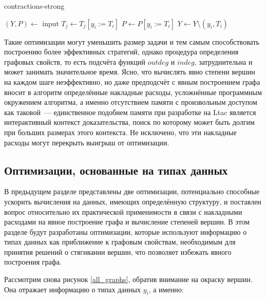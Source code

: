 \documentclass[../thesis.tex]{subfiles}
\begin{document}
\begin{megaalgorithm}
    \caption{contractions-strong}
  \begin{algorithmic}
    \State $(Y, P)\gets$ input
        \If{\textcolor{red}{$outdeg(y_i) = 1$}}
                \State $T_j \gets T_j [y_i := T_i]$
            \EndFor
            \State $P \gets P [y_i := T_i]$
            \State $Y\gets Y \setminus (y_i, T_i)$
        \EndIf
    \EndFor
    \State {}
  \end{algorithmic}
\end{megaalgorithm}

Такие оптимизации могут уменьшить размер задачи и тем самым способствовать построению более эффективных стратегий, однако процедура определения графовых свойств, то есть подсчёта функций $outdeg$ и $indeg$, затруднительна и может занимать значительное время. Ясно, что вычислять явно степени вершин на каждом шаге неэффективно, но даже предподсчёт с явным построением графа вносит в алгоритм определённые накладные расходы, усложнённые программным окружением алгоритма, а именно отсутствием памяти с произвольным доступом как таковой~--- единственное подобием памяти при разработке на Ltac является интерактивный контекст доказательства, поиск по которому может быть долгим при больших размерах этого контекста. Не исключено, что эти накладные расходы могут перекрыть выигрыш от оптимизации.

\subsection{Оптимизации, основанные на типах данных}\label{typebased}

В предыдущем разделе представлены две оптимизации, потенциально способные ускорить вычисления на данных, имеющих определённую структуру, и поставлен вопрос относительно их практической применимости в связи с накладными расходами на явное построение графа и вычисление степеней вершин. В этом разделе будут разработаны оптимизации, которые используют информацию о типах данных как приближение к графовым свойствам, необходимым для принятия решений о стягивании вершин, что позволяет избежать явного построения графа.

Рассмотрим снова рисунок \ref{all_graphs}, обратив внимание на окраску вершин. Она отражает информацию о типах данных $y_i$, а именно:
\end{document}
